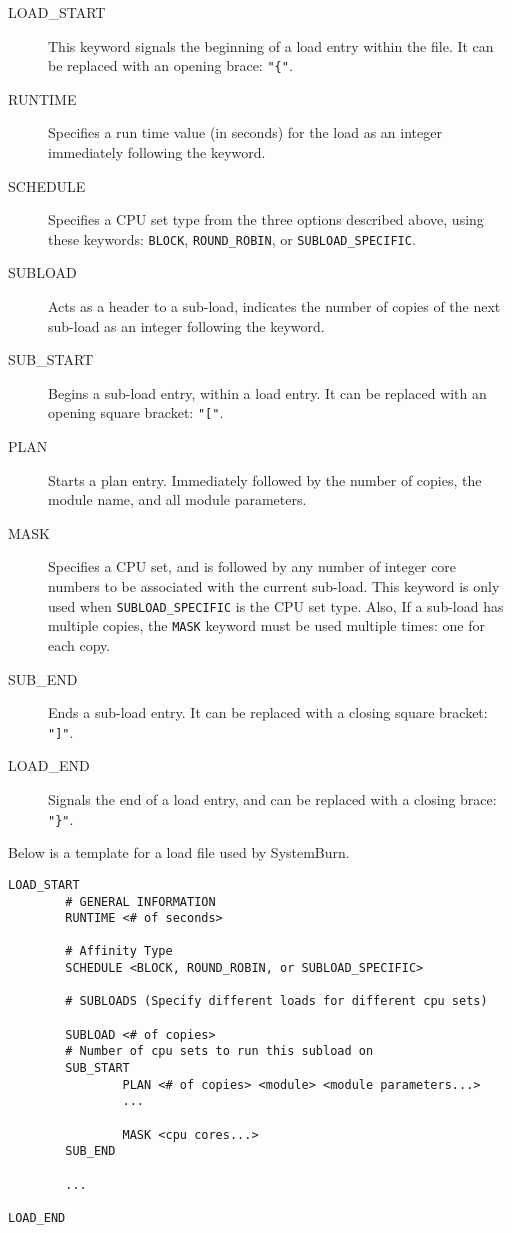 \begin{description}
	\item [LOAD\_START] This keyword signals the beginning of a load entry within the file. It can be replaced with an opening brace: \verb!"{"!.
	\item [RUNTIME] Specifies a run time value (in seconds) for the load as an integer immediately following the keyword.
	\item [SCHEDULE] Specifies a CPU set type from the three options described above, using these keywords: \verb!BLOCK!, \verb!ROUND_ROBIN!, or \verb!SUBLOAD_SPECIFIC!.
	\item [SUBLOAD] Acts as a header to a sub-load, indicates the number of copies of the next sub-load as an integer following the keyword.
	\item [SUB\_START] Begins a sub-load entry, within a load entry. It can be replaced with an opening square bracket: \verb!"["!.
	\item [PLAN] Starts a plan entry. Immediately followed by the number of copies, the module name, and all module parameters.
	\item [MASK] Specifies a CPU set, and is followed by any number of integer core numbers to be associated with the current sub-load. This keyword is only used when \verb!SUBLOAD_SPECIFIC! is the CPU set type. Also, If a sub-load has multiple copies, the \verb!MASK! keyword must be used multiple times: one for each copy.
	\item [SUB\_END] Ends a sub-load entry. It can be replaced with a closing square bracket: \verb!"]"!.
	\item [LOAD\_END] Signals the end of a load entry, and can be replaced with a closing brace: \verb!"}"!.
\end{description}

Below is a template for a load file used by SystemBurn. 

\begin{verbatim}
LOAD_START
        # GENERAL INFORMATION
        RUNTIME <# of seconds>

        # Affinity Type
        SCHEDULE <BLOCK, ROUND_ROBIN, or SUBLOAD_SPECIFIC>

        # SUBLOADS (Specify different loads for different cpu sets)

        SUBLOAD <# of copies>
        # Number of cpu sets to run this subload on
        SUB_START
                PLAN <# of copies> <module> <module parameters...>
                ...

                MASK <cpu cores...>
        SUB_END

        ...

LOAD_END
\end{verbatim}

